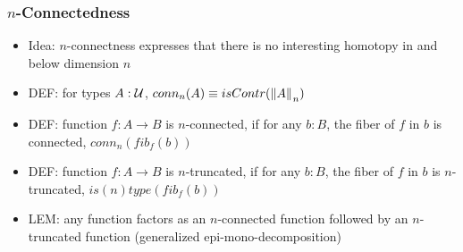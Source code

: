 \documentclass[handout]{beamer}
\newcommand{\UU}{{\cal U}}
\newcommand{\bfone}{\mathbf{1}}
\begin{document}
     \frame
  {
    \frametitle{$n$-Connectedness}
    
\begin{itemize}
    \item Idea: $n$-connectness expresses that there is no interesting homotopy in and below dimension $n$
    \item DEF: for types $A:\UU$, $conn_n(A) \equiv isContr({\mathopen{}\left\Vert A\right\Vert_{}\mathclose{}}_{n})$ %
    \item DEF: function $f: A\to B$ is $n$-connected, if for any $b:B$, 
             the fiber of $f$ in $b$ is connected, $conn_n(fib_f(b))$
    \item DEF: function $f: A\to B$ is $n$-truncated, if for any $b:B$, 
    the fiber of $f$ in $b$ is $n$-truncated, $is(n)type(fib_f(b))$
    \item LEM: any function factors as an $n$-connected function followed by an $n$-truncated function
    (generalized epi-mono-decomposition)
 \end{itemize}
  }
  
  
\end{document}
